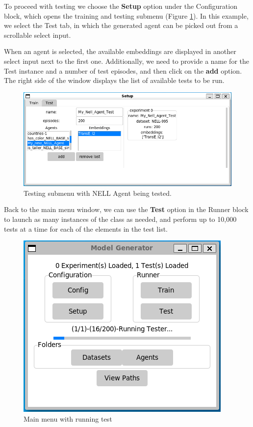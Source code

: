 To proceed with testing we choose the \textbf{Setup} option under the Configuration block, which opens the training and testing submenu (Figure \ref{fig:s_NELL_test}). In this example, we select the Test tab, in which the generated agent can be picked out from a scrollable select input.

When an agent is selected, the available embeddings are displayed in another select input next to the first one. Additionally, we need to provide a name for the Test instance and a number of test episodes, and then click on the \textbf{add} option. The right side of the window displays the list of available tests to be run. 

\begin{figure}[!ht]
    \centering
    \includegraphics[width=.75\textwidth]{fig/framework/GUI/NELL_agent_test.PNG}
    \caption{Testing submenu with NELL Agent being tested.}
    \label{fig:s_NELL_test}
\end{figure}

Back to the main menu window, we can use the \textbf{Test} option in the Runner block to launch as many instances of the  class as needed,  and perform up to 10,000 tests at a time for each of the elements in the test list.

\begin{figure}[!ht]
    \centering
    \includegraphics[width=.5\textwidth]{fig/framework/GUI/NELL_agent_running.PNG}
    \caption{Main menu with running test}
    \label{fig:mm_NELL_test}
\end{figure}

